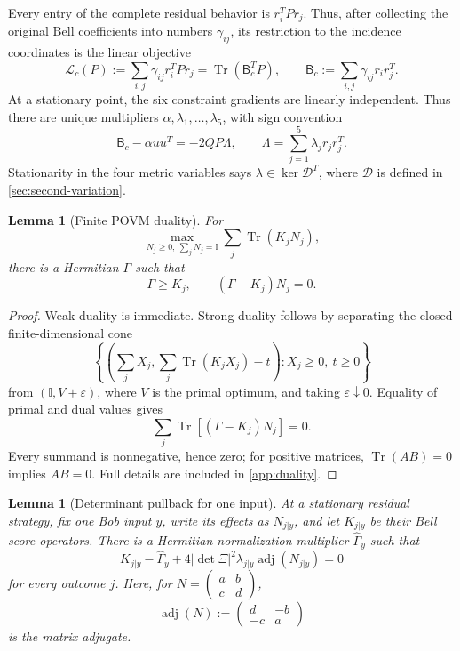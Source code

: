 \documentclass[11pt]{article}
\newtheorem{lemma}[theorem]{Lemma}
\theoremstyle{definition}
\newcommand{\Tr}{\operatorname{Tr}}
\newcommand{\id}{\mathbb I}
\newcommand{\cD}{\mathcal D}
\newcommand{\eps}{\varepsilon}
\begin{document}
Every entry of the complete residual behavior is \(r_i^TPr_j\). Thus, after
collecting the original Bell coefficients into numbers
\(\gamma_{ij}\), its restriction to the incidence coordinates is the linear
objective
\[
\mathcal L_c(P):=\sum_{i,j}\gamma_{ij}r_i^TPr_j
=\Tr(\mathsf B_c^TP),\qquad
\mathsf B_c:=\sum_{i,j}\gamma_{ij}r_ir_j^T.
\]
At a stationary point, the six constraint gradients are linearly independent.
Thus there are unique multipliers
\(\alpha,\lambda_1,\ldots,\lambda_5\), with sign convention
\begin{equation}
\label{eq:lagrange}
\mathsf B_c-\alpha uu^T=-2QP\Lambda,\qquad
\Lambda=\sum_{j=1}^5\lambda_jr_jr_j^T.
\end{equation}
Stationarity in the four metric variables says
\(\lambda\in\ker\cD^T\), where \(\cD\) is defined in
\cref{sec:second-variation}.

\begin{lemma}[Finite POVM duality]
\label{lem:povm-duality}
For
\[
\max_{N_j\ge0,\ \sum_jN_j=\id}\sum_j\Tr(K_jN_j),
\]
there is a Hermitian \(\Gamma\) such that
\[
\Gamma\ge K_j,\qquad(\Gamma-K_j)N_j=0.
\]
\end{lemma}

\begin{proof}
Weak duality is immediate. Strong duality follows by separating the closed
finite-dimensional cone
\[
\left\{\left(\sum_jX_j,\sum_j\Tr(K_jX_j)-t\right):
X_j\ge0,\ t\ge0\right\}
\]
from \((\id,V+\eps)\), where \(V\) is the primal optimum, and taking
\(\eps\downarrow0\). Equality of primal and dual values gives
\[
\sum_j\Tr[(\Gamma-K_j)N_j]=0.
\]
Every summand is nonnegative, hence zero; for positive matrices,
\(\Tr(AB)=0\) implies \(AB=0\). Full details are included in
\cref{app:duality}.
\end{proof}

\begin{lemma}[Determinant pullback for one input]
\label{lem:determinant-pullback}
At a stationary residual strategy, fix one Bob input \(y\), write its effects
as \(N_{j|y}\), and let \(K_{j|y}\) be their Bell score operators. There is a
Hermitian normalization multiplier \(\widehat\Gamma_y\) such that
\begin{equation}
\label{eq:effect-kkt}
K_{j|y}-\widehat\Gamma_y+
4|\det\Xi|^2\lambda_{j|y}\operatorname{adj}(N_{j|y})=0
\end{equation}
for every outcome \(j\). Here, for
\(N=\left(\begin{smallmatrix}a&b\\c&d\end{smallmatrix}\right)\),
\[
\operatorname{adj}(N):=
\begin{pmatrix}d&-b\\-c&a\end{pmatrix}
\]
is the matrix adjugate.
\end{lemma}
\end{document}
